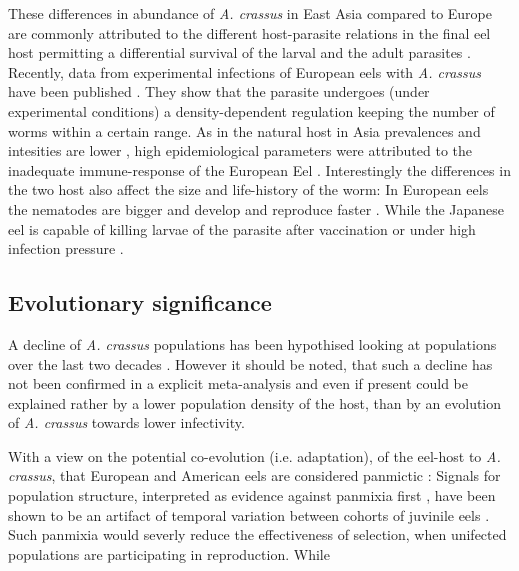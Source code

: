 These differences in abundance of \textit{A. crassus} in East Asia
compared to Europe are commonly attributed to the different
host-parasite relations in the final eel host permitting a
differential survival of the larval and the adult parasites
\cite{knopf_differences_2004}. Recently, data from experimental
infections of European eels with \textit{A. crassus} have been
published \cite{fazio_regulation_2008}. They show that the parasite
undergoes (under experimental conditions) a density-dependent
regulation keeping the number of worms within a certain range. As in
the natural host in Asia prevalences and intesities are lower
\cite{mnderle_occurrence_2006}, high epidemiological parameters were
attributed to the inadequate immune-response of the European Eel
\cite{knopf_swimbladder_2006}. Interestingly the differences in the
two host also affect the size and life-history of the worm: In
European eels the nematodes are bigger and develop and reproduce
faster \cite{knopf_differences_2004}.  While the Japanese eel is
capable of killing larvae of the parasite after vaccination
\cite{knopf_vaccination_2008} or under high infection pressure
\cite{heitlinger_massive_2009}.



\subsection{Evolutionary significance}
\label{ev-sig}

A decline of \textit{A. crassus} populations has been hypothised
looking at populations over the last two decades
\cite{lefebvre_anguillicolosis:_2004}. However it should be noted,
that such a decline has not been confirmed in a explicit meta-analysis
and even if present could be explained rather by a lower population
density of the host, than by an evolution of \textit{A. crassus}
towards lower infectivity.

With a view on the potential co-evolution (i.e. adaptation), of the
eel-host to \textit{A. crassus}, that European and American eels are
considered panmictic \cite{pmid20735687}: Signals for population
structure, interpreted as evidence against panmixia first
\cite{pmid11234011}, have been shown to be an artifact of temporal
variation between cohorts of juvinile eels \cite{pmid19417764,
  pmid21299662, pmid16024374}. Such panmixia would severly reduce the
effectiveness of selection, when unifected populations are
participating in reproduction. While


